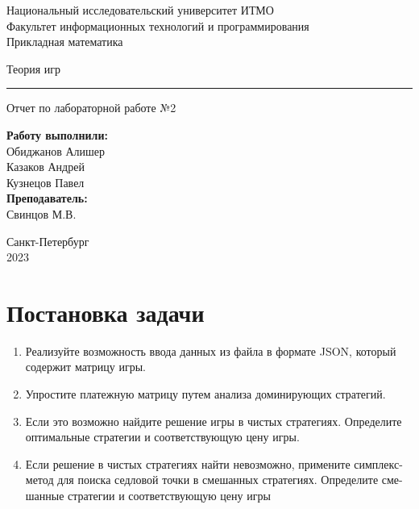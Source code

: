\documentclass{article}
\begin{document}
\begin{center}
    Национальный исследовательский университет ИТМО\\
    Факультет информационных технологий и программирования\\
    Прикладная математика
\end{center}
\vspace{20em}
\begin{center}
    {\Large Теория игр}
    \vspace{3pt}
    \hrule
    \vspace{3pt}
    Отчет по лабораторной работе №2
\end{center}
\vspace{20em}
\begin{flushright}
    \textbf{ Работу выполнили: } \\
    Обиджанов Алишер\\
    Казаков Андрей\\
    Кузнецов Павел\\
    \vspace{1em}
    \textbf{ Преподаватель: } \\
    Свинцов М.В.
\end{flushright}
\vspace{12em}
\begin{center}
    Санкт-Петербург \\
    2023
\end{center}
\newpage

\section{Постановка задачи}

\begin{enumerate}
    \item Реализуйте возможность ввода данных из файла в формате JSON, который
          содержит матрицу игры.
    \item Упростите платежную матрицу путем анализа доминирующих стратегий.
    \item Если это возможно найдите решение игры в чистых стратегиях. Определите
          оптимальные стратегии и соответствующую цену игры.
    \item Если решение в чистых стратегиях найти невозможно, примените симплекс-
          метод для поиска седловой точки в смешанных стратегиях. Определите сме-
          шанные стратегии и соответствующую цену игры
\end{enumerate}
\end{document}
